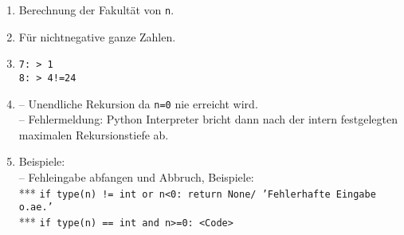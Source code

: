 \begin{enumerate}
	\item Berechnung der Fakultät von \texttt{n}.
	\item Für nichtnegative ganze Zahlen.
	\item\texttt{7: > 1}\\\texttt{8: > 4!=24}
	\item 
	-- Unendliche Rekursion da \texttt{n=0} nie erreicht wird.\\ 
	-- Fehlermeldung: Python Interpreter bricht dann nach der intern festgelegten maximalen Rekursionstiefe ab.
	\item Beispiele:\\
	-- Fehleingabe abfangen und Abbruch, Beispiele:\\
	  *** \texttt{if type(n) != int or n<0: return None/ 'Fehlerhafte Eingabe o.ae.'}\\
	  *** \texttt{if type(n) == int and n>=0: <Code>}
\end{enumerate}
